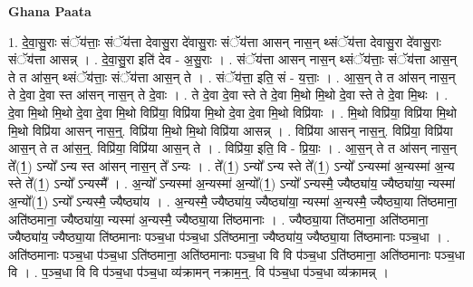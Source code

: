 \documentclass[17pt]{extarticle}
\begin{document}
\textbf{Ghana Paata } \newline

1. दे॒वा॒सु॒राः संॅय॑त्ताः॒ संॅय॑त्ता देवासु॒रा दे॑वासु॒राः संॅय॑त्ता आसन् नास॒न् थ्संॅय॑त्ता देवासु॒रा दे॑वासु॒राः संॅय॑त्ता आसन्न् । . दे॒वा॒सु॒रा इति॑ देव - अ॒सु॒राः । . संॅय॑त्ता आसन् नास॒न् थ्संॅय॑त्ताः॒ संॅय॑त्ता आस॒न् ते त आ॑स॒न् थ्संॅय॑त्ताः॒ संॅय॑त्ता आस॒न् ते । . संॅय॑त्ता॒ इति॒ सं - य॒त्ताः॒ । . आ॒स॒न् ते त आ॑सन् नास॒न् ते दे॒वा दे॒वा स्त आ॑सन् नास॒न् ते दे॒वाः । . ते दे॒वा दे॒वा स्ते ते दे॒वा मि॒थो मि॒थो दे॒वा स्ते ते दे॒वा मि॒थः । . दे॒वा मि॒थो मि॒थो दे॒वा दे॒वा मि॒थो विप्रि॑या॒ विप्रि॑या मि॒थो दे॒वा दे॒वा मि॒थो विप्रि॑याः । . मि॒थो विप्रि॑या॒ विप्रि॑या मि॒थो मि॒थो विप्रि॑या आसन् नास॒न्॒. विप्रि॑या मि॒थो मि॒थो विप्रि॑या आसन्न् । . विप्रि॑या आसन् नास॒न्॒. विप्रि॑या॒ विप्रि॑या आस॒न् ते त आ॑स॒न्॒. विप्रि॑या॒ विप्रि॑या आस॒न् ते । . विप्रि॑या॒ इति॒ वि - प्रि॒याः॒ । . आ॒स॒न् ते त आ॑सन् नास॒न् ते᳚(1॒) ऽन्यो᳚ ऽन्य स्त आ॑सन् नास॒न् ते᳚ ऽन्यः । . ते᳚(1॒) ऽन्यो᳚ ऽन्य स्ते ते᳚(1॒) ऽन्यो᳚ ऽन्यस्मा॑ अ॒न्यस्मा॑ अ॒न्य स्ते ते᳚(1॒) ऽन्यो᳚ ऽन्यस्मै᳚ । . अ॒न्यो᳚ ऽन्यस्मा॑ अ॒न्यस्मा॑ अ॒न्यो᳚(1॒) ऽन्यो᳚ ऽन्यस्मै॒ ज्यैष्ठ्या॑य॒ ज्यैष्ठ्या॑या॒ न्यस्मा॑ अ॒न्यो᳚(1॒) ऽन्यो᳚ ऽन्यस्मै॒ ज्यैष्ठ्या॑य । . अ॒न्यस्मै॒ ज्यैष्ठ्या॑य॒ ज्यैष्ठ्या॑या॒ न्यस्मा॑ अ॒न्यस्मै॒ ज्यैष्ठ्या॒या ति॑ष्ठमाना॒ अति॑ष्ठमाना॒ ज्यैष्ठ्या॑या॒ न्यस्मा॑ अ॒न्यस्मै॒ ज्यैष्ठ्या॒या ति॑ष्ठमानाः । . ज्यैष्ठ्या॒या ति॑ष्ठमाना॒ अति॑ष्ठमाना॒ ज्यैष्ठ्या॑य॒ ज्यैष्ठ्या॒या ति॑ष्ठमानाः पञ्च॒धा प॑ञ्च॒धा ऽति॑ष्ठमाना॒ ज्यैष्ठ्या॑य॒ ज्यैष्ठ्या॒या ति॑ष्ठमानाः पञ्च॒धा । . अति॑ष्ठमानाः पञ्च॒धा प॑ञ्च॒धा ऽति॑ष्ठमाना॒ अति॑ष्ठमानाः पञ्च॒धा वि वि प॑ञ्च॒धा ऽति॑ष्ठमाना॒ अति॑ष्ठमानाः पञ्च॒धा वि । . प॒ञ्च॒धा वि वि प॑ञ्च॒धा प॑ञ्च॒धा व्य॑क्रामन् नक्राम॒न्॒. वि प॑ञ्च॒धा प॑ञ्च॒धा व्य॑क्रामन्न् । \newline
\end{document}
